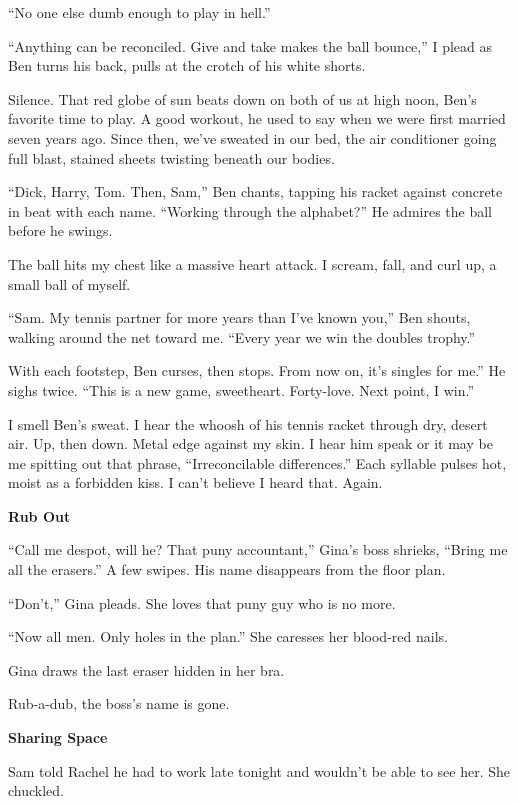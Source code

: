 \documentclass[
]{article}
\begin{document}
``No one else dumb enough to play in hell.''

``Anything can be reconciled. Give and take makes the ball bounce,'' I
plead as Ben turns his back, pulls at the crotch of his white shorts.

Silence. That red globe of sun beats down on both of us at high noon,
Ben's favorite time to play. A good workout, he used to say when we were
first married seven years ago. Since then, we've sweated in our bed, the
air conditioner going full blast, stained sheets twisting beneath our
bodies.

``Dick, Harry, Tom. Then, Sam,'' Ben chants, tapping his racket against
concrete in beat with each name. ``Working through the alphabet?'' He
admires the ball before he swings.

The ball hits my chest like a massive heart attack. I scream, fall, and
curl up, a small ball of myself.

``Sam. My tennis partner for more years than I've known you,'' Ben
shouts, walking around the net toward me. ``Every year we win the
doubles trophy.''

With each footstep, Ben curses, then stops. From now on, it's singles
for me.'' He sighs twice. ``This is a new game, sweetheart. Forty-love.
Next point, I win.''

I smell Ben's sweat. I hear the whoosh of his tennis racket through dry,
desert air. Up, then down. Metal edge against my skin. I hear him speak
or it may be me spitting out that phrase, ``Irreconcilable
differences.'' Each syllable pulses hot, moist as a forbidden kiss. I
can't believe I heard that. Again.

\textbf{\hfill\break
}

\textbf{Rub Out}

``Call me despot, will he? That puny accountant,'' Gina's boss shrieks,
``Bring me all the erasers.'' A few swipes. His name disappears from the
floor plan.

``Don't,'' Gina pleads. She loves that puny guy who is no more.

``Now all men. Only holes in the plan.'' She caresses her blood-red
nails.

Gina draws the last eraser hidden in her bra.

Rub-a-dub, the boss's name is gone.

\textbf{\hfill\break
}

\textbf{Sharing Space}

Sam told Rachel he had to work late tonight and wouldn't be able to see
her. She chuckled.
\end{document}
